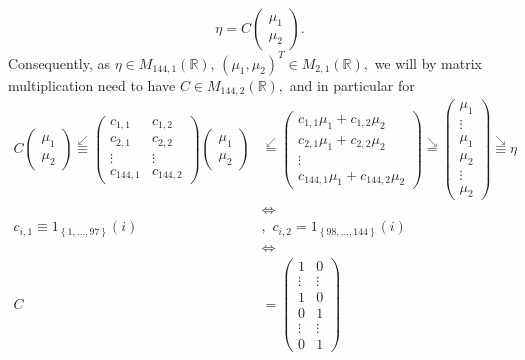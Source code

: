 \documentclass[
]{article}
\begin{document}
\[
\eta=C\begin{pmatrix}
\mu_1\\
\mu_2
\end{pmatrix}.
\] Consequently, as
\(\eta\in M_{144,1}(\mathbb{R}),\,\left({\mu_1, \mu_2}\right)^T\in M_{2,1}(\mathbb{R}),\)
we will by matrix multiplication need to have
\(C\in M_{144,2}(\mathbb{R}),\) and in particular for \begin{align*}
C\begin{pmatrix}
\mu_1\\
\mu_2
\end{pmatrix}
\overset{\swarrow}{\equiv}
\begin{pmatrix}
c_{1,1} & c_{1,2} \\
c_{2,1} & c_{2,2} \\
\vdots & \vdots \\
c_{144,1} & c_{144,2}
\end{pmatrix}\begin{pmatrix}
\mu_1\\
\mu_2
\end{pmatrix}&\overset{\swarrow}{=}
\begin{pmatrix}
c_{1,1}\mu_1 + c_{1,2}\mu_2 \\
c_{2,1}\mu_1 + c_{2,2}\mu_2 \\
\vdots \\
c_{144,1}\mu_1 + c_{144,2}\mu_2 
\end{pmatrix}\overset{\searrow}{=}\begin{pmatrix}
\mu_1\\
\vdots\\
\mu_1\\
\mu_2\\
\vdots\\
\mu_2
\end{pmatrix}\overset{\searrow}{\equiv}\eta\\
&\Leftrightarrow\\
c_{i,1}\equiv 1_{\left\{{1,\ldots,97}\right\}}(i)&,\,\,c_{i,2}=1_{\left\{{98,\ldots,144}\right\}}(i)\\
&\Leftrightarrow\\
C&=\begin{pmatrix}
1 & 0 \\
\vdots & \vdots \\
1 & 0 \\
0 & 1 \\
\vdots & \vdots \\
0 & 1
\end{pmatrix}
\end{align*}
\end{document}
